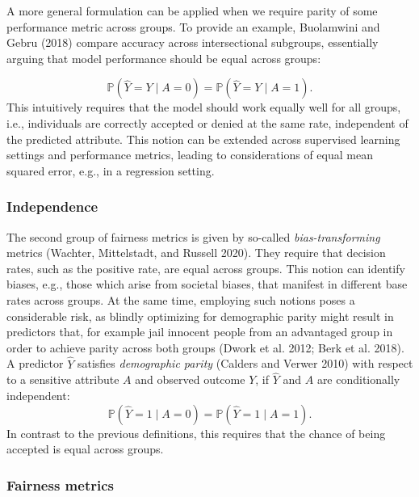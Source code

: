 A more general formulation can be applied when we require parity of some performance metric across groups.
To provide an example, Buolamwini and Gebru (2018) compare accuracy across intersectional subgroups, essentially arguing that model performance should be equal across groups:

\begin{equation}
\mathbb{P}\left(\hat{Y} = Y \mid A = 0\right) = \mathbb{P}\left(\hat{Y} = Y \mid A = 1\right).
 \label{eq:accp}
\end{equation}
This intuitively requires that the model should work equally well for all groups, i.e., individuals are correctly accepted or denied at the same rate, independent of the predicted attribute.
This notion can be extended across supervised learning settings and performance metrics, leading to considerations of equal mean squared error, e.g., in a regression setting.

\hypertarget{independence}{%
\subsubsection{Independence}\label{independence}}

The second group of fairness metrics is given by so-called \emph{bias-transforming} metrics (Wachter, Mittelstadt, and Russell 2020).
They require that decision rates, such as the positive rate, are equal across groups.
This notion can identify biases, e.g., those which arise from societal biases, that manifest in different base rates across groups.
At the same time, employing such notions poses a considerable risk, as blindly optimizing for demographic parity might result in predictors that, for example jail innocent people from an advantaged group in order to achieve parity across both groups (Dwork et al. 2012; Berk et al. 2018).
A predictor \(\hat{Y}\) satisfies \emph{demographic parity} (Calders and Verwer 2010) with respect to a sensitive attribute \(A\) and observed outcome \(Y\), if \(\hat{Y}\) and \(A\) are conditionally independent:
\begin{equation}
\mathbb{P}\left(\hat{Y} = 1 \mid A = 0\right) = \mathbb{P}\left(\hat{Y} = 1 \mid A = 1\right).
 \label{eq:dp}
\end{equation}
In contrast to the previous definitions, this requires that the chance of being accepted is equal across groups.

\hypertarget{fairness-metrics}{%
\subsubsection{Fairness metrics}\label{fairness-metrics}}


